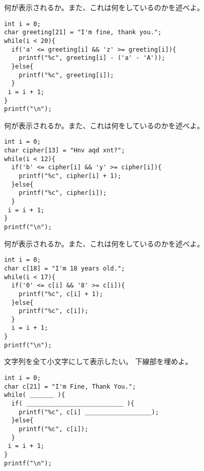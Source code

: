 \documentclass[12pt,a4j]{jarticle}
\newcounter{toi}
\def\toi{%
\bigskip\bigskip\noindent
\addtocounter{toi}{1}
\shadowbox{\bfseries\large 問\thetoi}
\nopagebreak[4]\bigskip\nopagebreak[4]
}
\begin{document}
\toi
\label{toi:toLarge}

何が表示されるか。また、これは何をしているのかを述べよ。
\begin{verbatim}
int i = 0;
char greeting[21] = "I'm fine, thank you.";
while(i < 20){
  if('a' <= greeting[i] && 'z' >= greeting[i]){
    printf("%c", greeting[i] - ('a' - 'A'));
  }else{
    printf("%c", greeting[i]);
  }
 i = i + 1;
}
printf("\n");
\end{verbatim}






\toi

何が表示されるか。また、これは何をしているのかを述べよ。
\begin{verbatim}
int i = 0;
char cipher[13] = "Hnv aqd xnt?";
while(i < 12){
  if('b' <= cipher[i] && 'y' >= cipher[i]){
    printf("%c", cipher[i] + 1);
  }else{
    printf("%c", cipher[i]);
  }
 i = i + 1;
}
printf("\n");
\end{verbatim}





\toi

何が表示されるか。また、これは何をしているのかを述べよ。
\begin{verbatim}
int i = 0;
char c[18] = "I'm 18 years old.";
while(i < 17){
  if('0' <= c[i] && '8' >= c[i]){
    printf("%c", c[i] + 1);
  }else{
    printf("%c", c[i]);
  }
  i = i + 1;
}
printf("\n");
\end{verbatim}





\toi

文字列を全て小文字にして表示したい。
下線部を埋めよ。
\begin{verbatim}
int i = 0;
char c[21] = "I'm Fine, Thank You.";
while( ＿＿＿＿ ){
  if( ＿＿＿＿＿＿＿＿＿＿＿＿＿＿＿＿ ){
    printf("%c", c[i] ＿＿＿＿＿＿＿＿＿＿＿);
  }else{
    printf("%c", c[i]);
  }
 i = i + 1;
}
printf("\n");
\end{verbatim}
\end{document}
